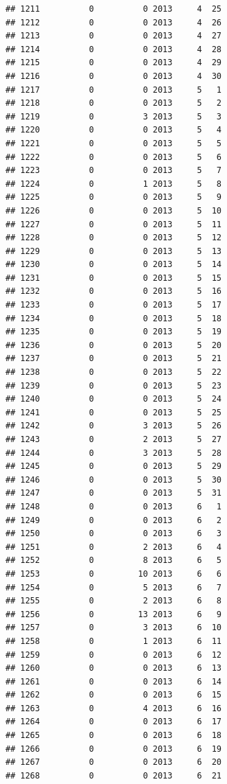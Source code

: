 \documentclass[
]{article}
\begin{document}
\begin{verbatim}
## 1211          0          0 2013     4  25
## 1212          0          0 2013     4  26
## 1213          0          0 2013     4  27
## 1214          0          0 2013     4  28
## 1215          0          0 2013     4  29
## 1216          0          0 2013     4  30
## 1217          0          0 2013     5   1
## 1218          0          0 2013     5   2
## 1219          0          3 2013     5   3
## 1220          0          0 2013     5   4
## 1221          0          0 2013     5   5
## 1222          0          0 2013     5   6
## 1223          0          0 2013     5   7
## 1224          0          1 2013     5   8
## 1225          0          0 2013     5   9
## 1226          0          0 2013     5  10
## 1227          0          0 2013     5  11
## 1228          0          0 2013     5  12
## 1229          0          0 2013     5  13
## 1230          0          0 2013     5  14
## 1231          0          0 2013     5  15
## 1232          0          0 2013     5  16
## 1233          0          0 2013     5  17
## 1234          0          0 2013     5  18
## 1235          0          0 2013     5  19
## 1236          0          0 2013     5  20
## 1237          0          0 2013     5  21
## 1238          0          0 2013     5  22
## 1239          0          0 2013     5  23
## 1240          0          0 2013     5  24
## 1241          0          0 2013     5  25
## 1242          0          3 2013     5  26
## 1243          0          2 2013     5  27
## 1244          0          3 2013     5  28
## 1245          0          0 2013     5  29
## 1246          0          0 2013     5  30
## 1247          0          0 2013     5  31
## 1248          0          0 2013     6   1
## 1249          0          0 2013     6   2
## 1250          0          0 2013     6   3
## 1251          0          2 2013     6   4
## 1252          0          8 2013     6   5
## 1253          0         10 2013     6   6
## 1254          0          5 2013     6   7
## 1255          0          2 2013     6   8
## 1256          0         13 2013     6   9
## 1257          0          3 2013     6  10
## 1258          0          1 2013     6  11
## 1259          0          0 2013     6  12
## 1260          0          0 2013     6  13
## 1261          0          0 2013     6  14
## 1262          0          0 2013     6  15
## 1263          0          4 2013     6  16
## 1264          0          0 2013     6  17
## 1265          0          0 2013     6  18
## 1266          0          0 2013     6  19
## 1267          0          0 2013     6  20
## 1268          0          0 2013     6  21

\end{verbatim}
\end{document}
